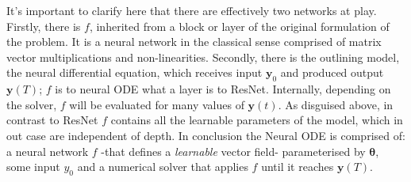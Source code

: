 \documentclass{article}
\begin{document}
    It's important to clarify here that there are effectively two networks at play.
    Firstly, there is $f$, inherited from a block or layer of the original formulation of the problem.
    It is a neural network in the classical sense comprised of matrix vector multiplications and non-linearities.
    Secondly, there is the outlining model, the neural differential equation, which receives input $\pmb{y}_0$ and produced output $\pmb{y}(T)$; $f$ is to neural ODE what a layer is to ResNet.
    Internally, depending on the solver, $f$ will be evaluated for many values of $\pmb{y}(t)$.
    As disguised above, in contrast to ResNet $f$ contains all the learnable parameters of the model, which in out case are independent of depth.
    In conclusion the Neural ODE is comprised of: a neural network $f$ -that defines a \textit{learnable} vector field- parameterised by $\pmb{\theta}$,  some input $y_0$ and a numerical solver that applies $f$ until it reaches $\pmb{y}(T)$.

    \begin{figure}[h]
        \begin{center}
            
        \end{center}
        \label{fig:enter-label}
    \end{figure}
\end{document}
